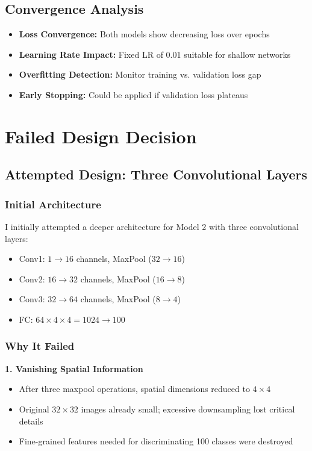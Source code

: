 \documentclass[11pt,a4paper]{article}
\begin{document}
\subsection{Convergence Analysis}

\begin{itemize}
    \item \textbf{Loss Convergence:} Both models show decreasing loss over epochs
    \item \textbf{Learning Rate Impact:} Fixed LR of 0.01 suitable for shallow networks
    \item \textbf{Overfitting Detection:} Monitor training vs. validation loss gap
    \item \textbf{Early Stopping:} Could be applied if validation loss plateaus
\end{itemize}

\section{Failed Design Decision}

\subsection{Attempted Design: Three Convolutional Layers}

\subsubsection{Initial Architecture}
I initially attempted a deeper architecture for Model 2 with three convolutional layers:
\begin{itemize}
    \item Conv1: $1 \rightarrow 16$ channels, MaxPool ($32 \rightarrow 16$)
    \item Conv2: $16 \rightarrow 32$ channels, MaxPool ($16 \rightarrow 8$)
    \item Conv3: $32 \rightarrow 64$ channels, MaxPool ($8 \rightarrow 4$)
    \item FC: $64 \times 4 \times 4 = 1024 \rightarrow 100$
\end{itemize}

\subsubsection{Why It Failed}

\textbf{1. Vanishing Spatial Information}
\begin{itemize}
    \item After three maxpool operations, spatial dimensions reduced to $4 \times 4$
    \item Original $32 \times 32$ images already small; excessive downsampling lost critical details
    \item Fine-grained features needed for discriminating 100 classes were destroyed
\end{itemize}
\end{document}
